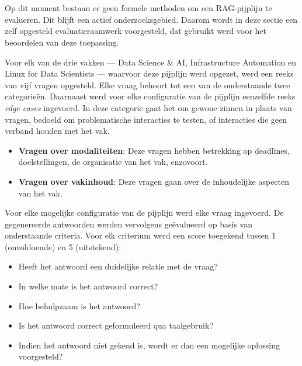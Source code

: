 \chapter{}%
\label{ch:evaluatie}

\section{}%
\label{sec:evaluatieraamwerk}

\subsection{}%
\label{subsec:opbouw}
    
Op dit moment bestaan er geen formele methoden om een RAG-pijplijn te evalueren. Dit blijft een actief onderzoeksgebied. Daarom wordt in deze sectie een zelf opgesteld evaluatieraamwerk voorgesteld, dat gebruikt werd voor het beoordelen van deze toepassing.

Voor elk van de drie vakken — Data Science \& AI, Infrastructure Automation en Linux for Data Scientists — waarvoor deze pijplijn werd opgezet, werd een reeks van vijf vragen opgesteld. Elke vraag behoort tot een van de onderstaande twee categorieën. Daarnaast werd voor elke configuratie van de pijplijn eenzelfde reeks \emph{edge cases} ingevoerd. In deze categorie gaat het om gewone zinnen in plaats van vragen, bedoeld om problematische interacties te testen, of interacties die geen verband houden met het vak. 

\begin{itemize}
    \item \textbf{Vragen over modaliteiten}: Deze vragen hebben betrekking op deadlines, doelstellingen, de organisatie van het vak, enzovoort.
    \item \textbf{Vragen over vakinhoud}: Deze vragen gaan over de inhoudelijke aspecten van het vak.
\end{itemize}

Voor elke mogelijke configuratie van de pijplijn werd elke vraag ingevoerd. De gegenereerde antwoorden werden vervolgens geëvalueerd op basis van onderstaande criteria. Voor elk criterium werd een score toegekend tussen 1 (onvoldoende) en 5 (uitstekend):

\begin{itemize}
    \item Heeft het antwoord een duidelijke relatie met de vraag?
    \item In welke mate is het antwoord correct?
    \item Hoe behulpzaam is het antwoord?
    \item Is het antwoord correct geformuleerd qua taalgebruik?
    \item Indien het antwoord niet gekend is, wordt er dan een mogelijke oplossing voorgesteld?
\end{itemize}

